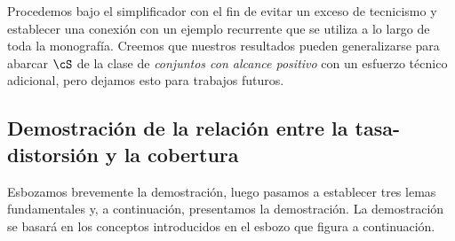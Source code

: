 \documentclass[../../book-main_es.tex]{subfiles}
\begin{document}
Procedemos bajo el  simplificador con el fin de
evitar un exceso de tecnicismo y establecer una conexión con un ejemplo recurrente
que se utiliza a lo largo de toda la monografía. Creemos que nuestros resultados pueden generalizarse
para abarcar $\cS$ de la clase de \textit{conjuntos con alcance positivo} con
un esfuerzo técnico adicional, pero dejamos esto para trabajos futuros.

\subsection{Demostración de la relación entre la tasa-distorsión y la cobertura}

Esbozamos brevemente la demostración, luego pasamos a establecer tres
lemas fundamentales y, a continuación, presentamos la demostración. La demostración se basará en los conceptos introducidos en el
esbozo que figura a continuación.
\end{document}
